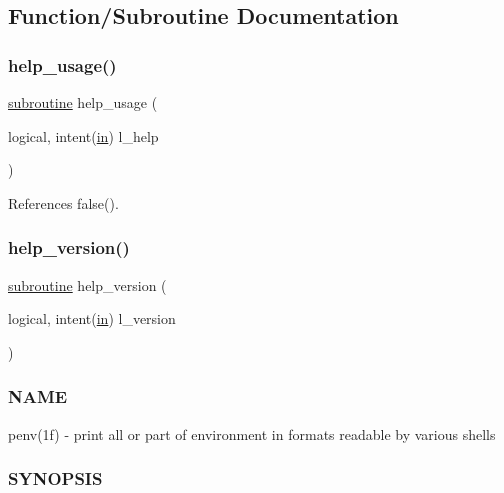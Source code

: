 \subsection{Function/\+Subroutine Documentation}
\mbox{\label{penv_8f90_a3e09a3b52ee8fb04eeb93fe5761626a8}} 
\subsubsection{\texorpdfstring{help\+\_\+usage()}{help\_usage()}}
{\footnotesize\ttfamily \hyperlink{M__stopwatch_83_8txt_acfbcff50169d691ff02d4a123ed70482}{subroutine} help\+\_\+usage (\begin{DoxyParamCaption}\item[{logical, intent(\hyperlink{M__journal_83_8txt_afce72651d1eed785a2132bee863b2f38}{in})}]{l\+\_\+help }\end{DoxyParamCaption})}



References false().

\mbox{\label{penv_8f90_a39c21619b08a3c22f19e2306efd7f766}} 
\subsubsection{\texorpdfstring{help\+\_\+version()}{help\_version()}}
{\footnotesize\ttfamily \hyperlink{M__stopwatch_83_8txt_acfbcff50169d691ff02d4a123ed70482}{subroutine} help\+\_\+version (\begin{DoxyParamCaption}\item[{logical, intent(\hyperlink{M__journal_83_8txt_afce72651d1eed785a2132bee863b2f38}{in})}]{l\+\_\+version }\end{DoxyParamCaption})}



\subsubsection*{N\+A\+ME}

penv(1f) -\/ print all or part of environment in formats readable by various shells \subsubsection*{S\+Y\+N\+O\+P\+S\+IS}

